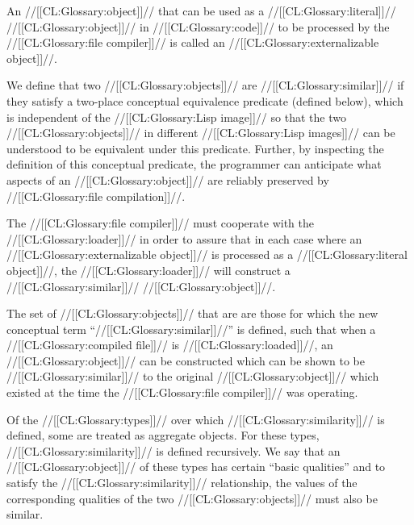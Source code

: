 An //[[CL:Glossary:object]]// that can be used as a //[[CL:Glossary:literal]]// //[[CL:Glossary:object]]//  in //[[CL:Glossary:code]]// to be processed by the //[[CL:Glossary:file compiler]]// is called an //[[CL:Glossary:externalizable object]]//.

We define that two //[[CL:Glossary:objects]]// are //[[CL:Glossary:similar]]// if they satisfy a two-place conceptual equivalence predicate (defined below), which is independent of the //[[CL:Glossary:Lisp image]]// so that the two //[[CL:Glossary:objects]]// in different //[[CL:Glossary:Lisp images]]// can be understood to be equivalent under this predicate.  Further, by inspecting the definition of this conceptual predicate, the programmer can anticipate what aspects of an //[[CL:Glossary:object]]// are reliably preserved by //[[CL:Glossary:file compilation]]//.

The //[[CL:Glossary:file compiler]]// must cooperate with the //[[CL:Glossary:loader]]// in order to assure that in each case where an //[[CL:Glossary:externalizable object]]// is processed as a //[[CL:Glossary:literal object]]//, the //[[CL:Glossary:loader]]// will construct a //[[CL:Glossary:similar]]// //[[CL:Glossary:object]]//.

The set of //[[CL:Glossary:objects]]// that are  are those for which the new conceptual term ``//[[CL:Glossary:similar]]//'' is defined, such that when a //[[CL:Glossary:compiled file]]// is //[[CL:Glossary:loaded]]//, an //[[CL:Glossary:object]]// can be constructed which can be shown to be //[[CL:Glossary:similar]]// to the original //[[CL:Glossary:object]]// which existed at the time the //[[CL:Glossary:file compiler]]// was operating.

\endsubsubsection%

 


Of the //[[CL:Glossary:types]]// over which //[[CL:Glossary:similarity]]// is defined,  some are treated as aggregate objects.  For these types,  //[[CL:Glossary:similarity]]// is defined recursively.   We say that an //[[CL:Glossary:object]]// of these types has certain ``basic qualities'' and to satisfy the //[[CL:Glossary:similarity]]// relationship, the values of the corresponding qualities of the two //[[CL:Glossary:objects]]// must also be similar.
  \endsubsubsubsection%

